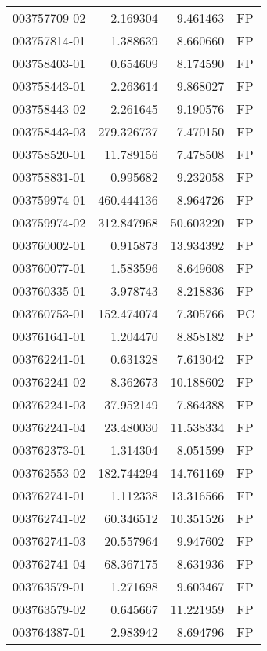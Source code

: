 \begin{tabular}{lrrl}
003757709-02 &    2.169304 &       9.461463 &   FP \\
003757814-01 &    1.388639 &       8.660660 &   FP \\
003758403-01 &    0.654609 &       8.174590 &   FP \\
003758443-01 &    2.263614 &       9.868027 &   FP \\
003758443-02 &    2.261645 &       9.190576 &   FP \\
003758443-03 &  279.326737 &       7.470150 &   FP \\
003758520-01 &   11.789156 &       7.478508 &   FP \\
003758831-01 &    0.995682 &       9.232058 &   FP \\
003759974-01 &  460.444136 &       8.964726 &   FP \\
003759974-02 &  312.847968 &      50.603220 &   FP \\
003760002-01 &    0.915873 &      13.934392 &   FP \\
003760077-01 &    1.583596 &       8.649608 &   FP \\
003760335-01 &    3.978743 &       8.218836 &   FP \\
003760753-01 &  152.474074 &       7.305766 &   PC \\
003761641-01 &    1.204470 &       8.858182 &   FP \\
003762241-01 &    0.631328 &       7.613042 &   FP \\
003762241-02 &    8.362673 &      10.188602 &   FP \\
003762241-03 &   37.952149 &       7.864388 &   FP \\
003762241-04 &   23.480030 &      11.538334 &   FP \\
003762373-01 &    1.314304 &       8.051599 &   FP \\
003762553-02 &  182.744294 &      14.761169 &   FP \\
003762741-01 &    1.112338 &      13.316566 &   FP \\
003762741-02 &   60.346512 &      10.351526 &   FP \\
003762741-03 &   20.557964 &       9.947602 &   FP \\
003762741-04 &   68.367175 &       8.631936 &   FP \\
003763579-01 &    1.271698 &       9.603467 &   FP \\
003763579-02 &    0.645667 &      11.221959 &   FP \\
003764387-01 &    2.983942 &       8.694796 &   FP \\

\end{tabular}
